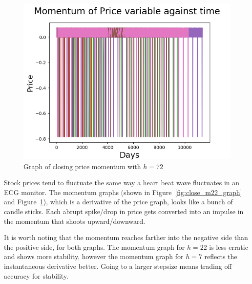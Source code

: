 \documentclass[8pt]{article}
\begin{document}
	\begin{figure}[h]
		\centering
		\includegraphics{all_momentum_step_7.png}
		\caption{Graph of closing price momentum with $h=72$}
		\label{fig:close_m7_graph}
	\end{figure}

	Stock prices tend to fluctuate the same way a heart beat wave fluctuates in an ECG monitor.
	The momentum graphs (shown in Figure~\ref{fig:close_m22_graph} and Figure~\ref{fig:close_m7_graph}), which is a derivative of the price graph, looks like a bunch of candle sticks.
	Each abrupt spike/drop in price gets converted into an impulse in the momentum that shoots upward/downward. 

	It is worth noting that the momentum reaches farther into the negative side than the positive side, for both graphs.
	The momentum graph for $h=22$ is less erratic and shows more stability, however the momentum graph for $h=7$ reflects the instantaneous derivative better.
	Going to a larger stepsize means trading off accuracy for stability.
	
\end{document}
